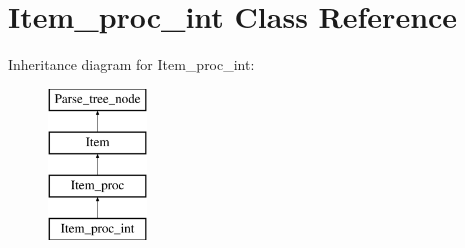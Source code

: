 \hypertarget{classItem__proc__int}{}\section{Item\+\_\+proc\+\_\+int Class Reference}
\label{classItem__proc__int}
Inheritance diagram for Item\+\_\+proc\+\_\+int\+:\begin{figure}[H]
\begin{center}
\leavevmode
\includegraphics[height=4.000000cm]{classItem__proc__int}
\end{center}
\end{figure}
